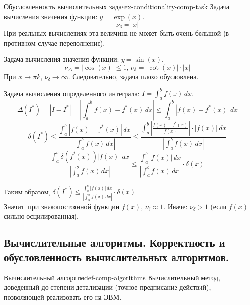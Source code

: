 \documentclass[14pt]{extarticle}
\begin{document}
    \begin{example}{Обусловленность вычислительных задач}{ex-conditionality-comp-task}
        Задача вычисления значения функции: $y = \exp(x)$.
        $$\nu_{\delta} = |x|$$ 
        При реальных вычислениях эта величина не может быть очень большой (в противном случае переполнение).

        \vspace{\baselineskip}

        Задача вычисления значения функции: $y = \sin(x)$.
        $$\nu_{\Delta} = |\cos(x)| \leq 1 \text{, } \nu_{\delta} = |\cot(x)| \cdot |x|$$
        При $x \to \pi k$, $\nu_{\delta} \to \infty$. Следовательно, задача плохо обусловлена.

        \vspace{\baselineskip}

        Задача вычисления определенного интеграла: $I = \int_{a}^{b} f(x) \, dx$.\\
        $$\Delta(I^{*}) = |I - I^{*}| = |\int_{a}^{b} f(x) - f^{*}(x) \, dx| \leq \int_{a}^{b} |f(x) - f^{*}(x)| \, dx$$
        $$\delta(I^{*}) \leq \frac{\int_{a}^{b} |f(x) - f^{*}(x)| \, dx}{|\int_{a}^{b} f(x) \, dx|} \leq \frac{\int_{a}^{b} |\frac{f(x) - f^{*}(x)}{f(x)}| \cdot |f(x)| \, dx}{|\int_{a}^{b} f(x) \, dx|}$$ 
        $$\frac{\int_{a}^{b} \delta(f^{*}(x)) |f(x)| \, dx}{|\int_{a}^{b} f(x) \, dx|} \leq \frac{\int_{a}^{b} |f(x)| \, dx}{|\int_{a}^{b} f(x) \, dx|} \cdot \overline{\delta(x)}$$

        Таким образом, $\delta(I^{*}) \leq \frac{\int_{a}^{b} |f(x)| \, dx}{|\int_{a}^{b} f(x) \, dx|} \cdot \overline{\delta(x)}$.\\
        Значит, при знакопостоянной функции $f(x)$, $\nu_{\delta} \approx 1$. Иначе: $\nu_{\delta} > 1$ (если $f(x)$ сильно осцилированная).
    \end{example}

\clearpage
\subsection{Вычислительные алгоритмы. Корректность и обусловленность вычислительных алгоритмов.}

    \begin{definition}{Вычислительный алгоритм}{def-comp-algorithms}
        Вычислительный метод, доведенный до степени детализации (точное предписание действий), позволяющей реализовать его на ЭВМ.
    \end{definition}
\end{document}

